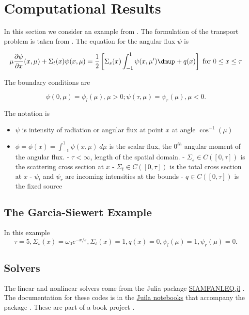\section{Computational Results}
\label{sec:results}
In this section we consider an example from
\cite{cesinh}. The formulation of the transport
problem is taken from \cite{ctk:jeff1}. The equation for the angular
flux \(\psi\) is

\[
\mu \frac{\partial \psi}{\partial x} (x,\mu) + \Sigma_t(x) \psi(x,\mu) =
\frac{1}{2} \left[ \Sigma_s(x) \int_{-1}^1 \psi(x, \mu') \dmup + q(x) \right]
 \mbox{ for } 0 \le x \le \tau
\]

The boundary conditions are

\[
\psi(0, \mu) = \psi_l(\mu), \mu > 0; \psi(\tau, \mu) = \psi_r(\mu),
\mu < 0.
\]

The notation is

\begin{itemize}
\item
  \(\psi\) is intensity of radiation or angular flux at point \(x\) at
  angle \(\cos^{-1} (\mu)\)
\item
  \(\phi = \phi(x) = \int_{-1}^{1}\psi(x,\mu) \ d\mu\) is the scalar
  flux, the \(0^{th}\) angular moment of the angular flux. -
  \(\tau < \infty\), length of the spatial domain. -
  \(\Sigma_s \in C([0,\tau])\) is the scattering cross section at \(x\)
  - \(\Sigma_t \in C([0,\tau])\) is the total cross section at \(x\) -
  \(\psi_l\) and \(\psi_r\) are incoming intensities at the bounds -
  \(q \in C([0,\tau])\) is the fixed source
\end{itemize}


\subsection{The Garcia-Siewert Example}
\label{the-garcia-siewert-example}

In this example \[
\tau=5, \Sigma_s(x) =\omega_0 e^{-x/s},  \Sigma_t(x) = 1, q(x) = 0, \psi_l(\mu) = 1, \psi_r(\mu) = 0.
\]

\subsection{Solvers}
\label{subsec:solvers}

The linear and nonlinear solvers come from the Julia package
\href{https://github.com/ctkelley/SIAMFANLEquations.jl}{SIAMFANLEQ.jl}
\cite{ctk:siamfanl}. The documentation for these codes is in the
\href{https://github.com/ctkelley/NotebookSIAMFANL}{Juila notebooks}
that accompany the package \cite{ctk:notebooknl}. 
These are part of a book project \cite{ctk:fajulia}. 

